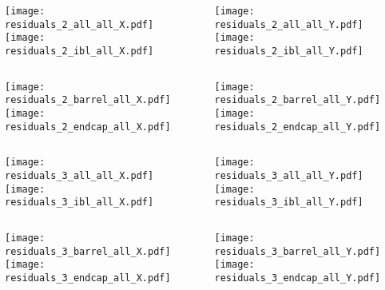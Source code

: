 \documentclass{beamer}
\begin{document}
\begin{frame}
\begin{columns}
\begin{column}{0.45\textwidth}
\texttt{[image: residuals\_2\_all\_all\_X.pdf]} \\ \vfill
\texttt{[image: residuals\_2\_ibl\_all\_X.pdf]}
\end{column}
\begin{column}{0.45\textwidth}
\texttt{[image: residuals\_2\_all\_all\_Y.pdf]} \\ \vfill
\texttt{[image: residuals\_2\_ibl\_all\_Y.pdf]}
\end{column}
\end{columns}
\end{frame}
\begin{frame}
\begin{columns}
\begin{column}{0.45\textwidth}
\texttt{[image: residuals\_2\_barrel\_all\_X.pdf]} \\ \vfill
\texttt{[image: residuals\_2\_endcap\_all\_X.pdf]}
\end{column}
\begin{column}{0.45\textwidth}
\texttt{[image: residuals\_2\_barrel\_all\_Y.pdf]} \\ \vfill
\texttt{[image: residuals\_2\_endcap\_all\_Y.pdf]}
\end{column}
\end{columns}
\end{frame}
\begin{frame}
\begin{columns}
\begin{column}{0.45\textwidth}
\texttt{[image: residuals\_3\_all\_all\_X.pdf]} \\ \vfill
\texttt{[image: residuals\_3\_ibl\_all\_X.pdf]}
\end{column}
\begin{column}{0.45\textwidth}
\texttt{[image: residuals\_3\_all\_all\_Y.pdf]} \\ \vfill
\texttt{[image: residuals\_3\_ibl\_all\_Y.pdf]}
\end{column}
\end{columns}
\end{frame}
\begin{frame}
\begin{columns}
\begin{column}{0.45\textwidth}
\texttt{[image: residuals\_3\_barrel\_all\_X.pdf]} \\ \vfill
\texttt{[image: residuals\_3\_endcap\_all\_X.pdf]}
\end{column}
\begin{column}{0.45\textwidth}
\texttt{[image: residuals\_3\_barrel\_all\_Y.pdf]} \\ \vfill
\texttt{[image: residuals\_3\_endcap\_all\_Y.pdf]}
\end{column}
\end{columns}
\end{frame}
\end{document}
